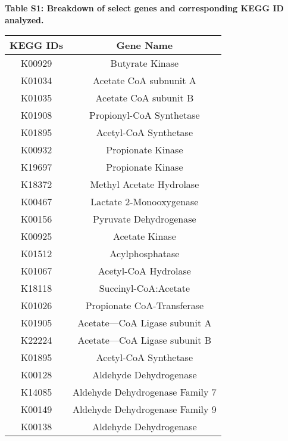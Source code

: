 \documentclass[11pt,]{article}
\title{}
\author{}
\date{}
\begin{document}

\textbf{Table S1: Breakdown of select genes and corresponding KEGG ID
analyzed.}

\begin{longtable}[]{@{}cc@{}}
\toprule
KEGG IDs & Gene Name\tabularnewline
\midrule
\endhead
K00929 & Butyrate Kinase\tabularnewline
K01034 & Acetate CoA subnunit A\tabularnewline
K01035 & Acetate CoA subunit B\tabularnewline
K01908 & Propionyl-CoA Synthetase\tabularnewline
K01895 & Acetyl-CoA Synthetase\tabularnewline
K00932 & Propionate Kinase\tabularnewline
K19697 & Propionate Kinase\tabularnewline
K18372 & Methyl Acetate Hydrolase\tabularnewline
K00467 & Lactate 2-Monooxygenase\tabularnewline
K00156 & Pyruvate Dehydrogenase\tabularnewline
K00925 & Acetate Kinase\tabularnewline
K01512 & Acylphosphatase\tabularnewline
K01067 & Acetyl-CoA Hydrolase\tabularnewline
K18118 & Succinyl-CoA:Acetate\tabularnewline
K01026 & Propionate CoA-Transferase\tabularnewline
K01905 & Acetate---CoA Ligase subunit A\tabularnewline
K22224 & Acetate---CoA Ligase subunit B\tabularnewline
K01895 & Acetyl-CoA Synthetase\tabularnewline
K00128 & Aldehyde Dehydrogenase\tabularnewline
K14085 & Aldehyde Dehydrogenase Family 7\tabularnewline
K00149 & Aldehyde Dehydrogenase Family 9\tabularnewline
K00138 & Aldehyde Dehydrogenase\tabularnewline
\bottomrule
\end{longtable}
\end{document}
